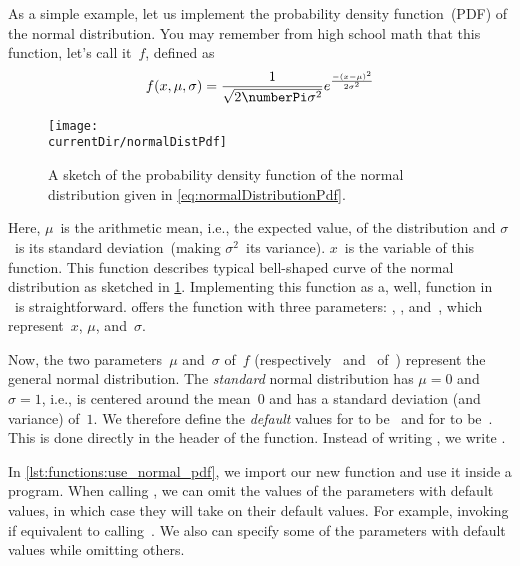 As a simple example, let us implement the probability density function~(PDF) of the normal distribution.
You may remember from high school math that this function, let's call it~$f$, defined as%
%
\begin{equation}%
f(x, \mu, \sigma) = \frac{1}{\sqrt{2\numberPi\sigma^2}} e^{\frac{-(x-\mu)^2}{2\sigma^2}}%
\label{eq:normalDistributionPdf}%
\end{equation}%
%
\begin{figure}%
\centering%
\texttt{[image: \\currentDir/normalDistPdf]}%
\caption{A sketch of the probability density function of the normal distribution given in \cref{eq:normalDistributionPdf}.}%
\label{fig:normalDistPdf}%
\end{figure}%
%
Here, $\mu$~is the arithmetic mean, i.e., the expected value, of the distribution and $\sigma$~is its standard deviation~(making $\sigma^2$~its variance).
$x$~is the variable of this function.
This function describes typical bell-shaped curve of the normal distribution as sketched in \cref{fig:normalDistPdf}.
Implementing this function as a, well, function in \python\ is straightforward.
 offers the function  with three parameters: , , and~, which represent~$x$, $\mu$, and~$\sigma$.%
%
\begin{sloppypar}%
Now, the two parameters~$\mu$ and~$\sigma$ of~$f$ (respectively~ and~ of~) represent the general normal distribution.
The \emph{standard} normal distribution has $\mu=0$ and $\sigma=1$, i.e., is centered around the mean~$0$ and has a standard deviation (and variance) of~$1$.
We therefore define the \emph{default} values for  to be~ and for  to be~.
This is done directly in the header of the function.
Instead of writing , we write .%
\end{sloppypar}%
%
In \cref{lst:functions:use_normal_pdf}, we import our new  function and use it inside a program.
When calling , we can omit the values of the parameters with default values, in which case they will take on their default values.
For example, invoking  if equivalent to calling~.
We also can specify some of the parameters with default values while omitting others.
